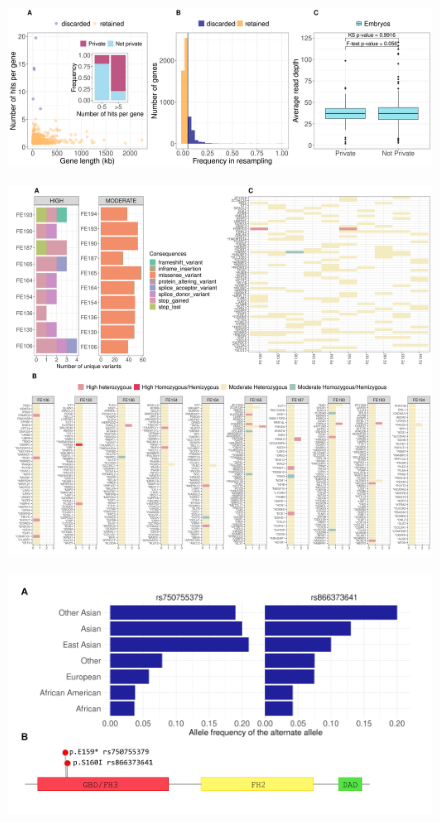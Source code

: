 \begin{figure}[ht]
\centering
\includegraphics[width=\linewidth]{fig/filters_embryos.png}
\caption{\textbf{}}
\label{fig:filters}
\end{figure}

\begin{figure}[ht]
\centering
\includegraphics[width=\linewidth]{fig/panel_EmbryoResults.png}
\caption{\textbf{}}
\label{fig:resembryo}
\end{figure}

\begin{figure}[ht]
\centering
\includegraphics[width=\linewidth]{fig/fmnl2.png}
\caption{\textbf{}}
\label{fig:fmnl2}
\end{figure}